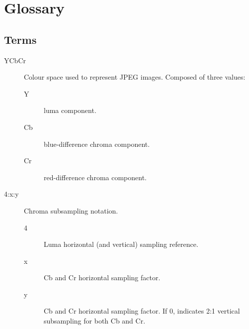 \chapter{Glossary}

\section*{Terms} 
\begin{description}
	\item[YCbCr] Colour space used to represent JPEG images. Composed of three values:
		\begin{description}
			\item[Y] luma component.
			\item[Cb] blue-difference chroma component.
			\item[Cr] red-difference chroma component.
		\end{description}
	\item[4:x:y]Chroma subsampling notation.
		\begin{description}
			\item[4] Luma horizontal (and vertical) sampling reference.
			\item[x] Cb and Cr horizontal sampling factor.
			\item[y] Cb and Cr horizontal sampling factor. If 0, indicates 2:1 vertical subsampling for both Cb and Cr.
		\end{description}
\end{description}

